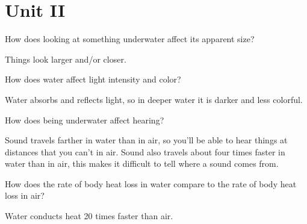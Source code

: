 	\chapter*{Unit II}
	\setcounter{questionnumber}{0}

	\begin{qanda}
		\begin{question}
How does looking at something underwater affect its apparent size?
		\end{question}

		\begin{answer}
Things look larger and/or closer.
		\end{answer}
	\end{qanda}

	\begin{qanda}
		\begin{question}
How does water affect light intensity and color?
		\end{question}

		\begin{answer}
Water absorbs and reflects light, so in deeper water it is darker and less colorful.
		\end{answer}
	\end{qanda}

	\begin{qanda}
		\begin{question}
How does being underwater affect hearing?
		\end{question}

		\begin{answer}
Sound travels farther in water than in air, so you'll be able to hear things at distances that you can't in air.  Sound also travels about four times faster in water than in air, this makes it difficult to tell where a sound comes from.
		\end{answer}
	\end{qanda}

	\begin{qanda}
		\begin{question}
How does the rate of body heat loss in water compare to the rate of body heat loss in air?
		\end{question}

		\begin{answer}
Water conducts heat 20 times faster than air.
		\end{answer}
	\end{qanda}

